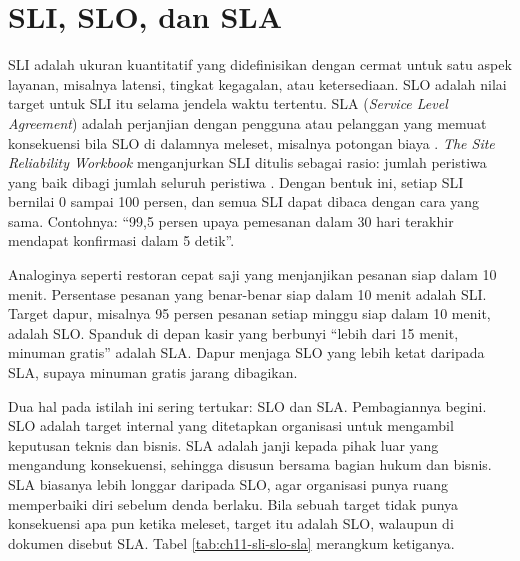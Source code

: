 \section{SLI, SLO, dan SLA}
\label{sec:ch11-sli-slo-sla}

SLI adalah ukuran kuantitatif yang didefinisikan dengan cermat untuk satu aspek layanan, misalnya
latensi, tingkat kegagalan, atau ketersediaan. SLO adalah nilai target untuk SLI itu selama jendela
waktu tertentu. SLA (\textit{Service Level Agreement}) adalah perjanjian dengan pengguna atau
pelanggan yang memuat konsekuensi bila SLO di dalamnya meleset, misalnya potongan biaya
\cite{beyer2016}.
\textit{The Site Reliability Workbook} menganjurkan SLI ditulis sebagai rasio: jumlah peristiwa
yang baik dibagi jumlah seluruh peristiwa \cite{c11-sre-workbook}. Dengan bentuk ini, setiap SLI
bernilai 0 sampai 100 persen, dan semua SLI dapat dibaca dengan cara yang sama. Contohnya: ``99,5
persen upaya pemesanan dalam 30 hari terakhir mendapat konfirmasi dalam 5 detik''.

Analoginya seperti restoran cepat saji yang menjanjikan pesanan siap dalam 10 menit. Persentase
pesanan yang benar-benar siap dalam 10 menit adalah SLI. Target dapur, misalnya 95 persen pesanan
setiap minggu siap dalam 10 menit, adalah SLO. Spanduk di depan kasir yang berbunyi ``lebih dari 15
menit, minuman gratis'' adalah SLA. Dapur menjaga SLO yang lebih ketat daripada SLA, supaya
minuman gratis jarang dibagikan.

Dua hal pada istilah ini sering tertukar: SLO dan SLA. Pembagiannya begini. SLO adalah target
internal yang ditetapkan organisasi untuk mengambil keputusan teknis dan bisnis. SLA adalah janji
kepada pihak luar yang mengandung konsekuensi, sehingga disusun bersama bagian hukum dan bisnis.
SLA biasanya lebih longgar daripada SLO, agar organisasi punya ruang memperbaiki diri sebelum denda
berlaku. Bila sebuah target tidak punya konsekuensi apa pun ketika meleset, target itu adalah SLO,
walaupun di dokumen disebut SLA. Tabel \ref{tab:ch11-sli-slo-sla} merangkum ketiganya.

